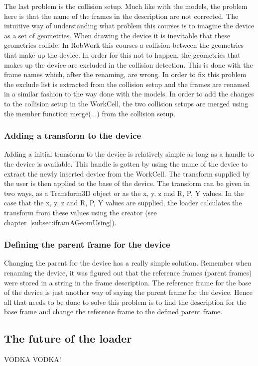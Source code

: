 The last problem is the collision setup. Much like with the models, the problem here is that the name of the frames in the description are not corrected. The intuitive way of understanding what problem this courses is to imagine the device as a set of geometries. When drawing the device it is inevitable that these geometries collide. In RobWork this courses a collision between the geometries that make up the device. In order for this not to happen, the geometries that makes up the device are excluded in the collision detection. This is done with the frame names which, after the renaming, are wrong. In order to fix this problem the exclude list is extracted from the collision setup and the frames are renamed in a similar fashion to the way done with the models. In order to add the changes to the collision setup in the WorkCell, the two collision setups are merged using the member function merge(...) from the collision setup.

\subsubsection{Adding a transform to the device}
Adding a initial transform to the device is relatively simple as long as a handle to the device is available. This handle is gotten by using the name of the device to extract the newly inserted device from the WorkCell. The transform supplied by the user is then applied to the base of the device. The transform can be given in two ways, as a Transform3D object or as the x, y, z and R, P, Y values. In the case that the x, y, z and R, P, Y values are supplied, the loader calculates the transform from these values using the creator (see chapter~\ref{subsec:iframAGeomUsing}).

\subsubsection{Defining the parent frame for the device}
Changing the parent for the device has a really simple solution. Remember when renaming the device, it was figured out that the reference frames (parent frames) were stored in a string in the frame description. The reference frame for the base of the device is just another way of saying the parent frame for the device. Hence all that needs to be done to solve this problem is to find the description for the base frame and change the reference frame to the defined parent frame.


\subsection{The future of the loader}
VODKA VODKA!

